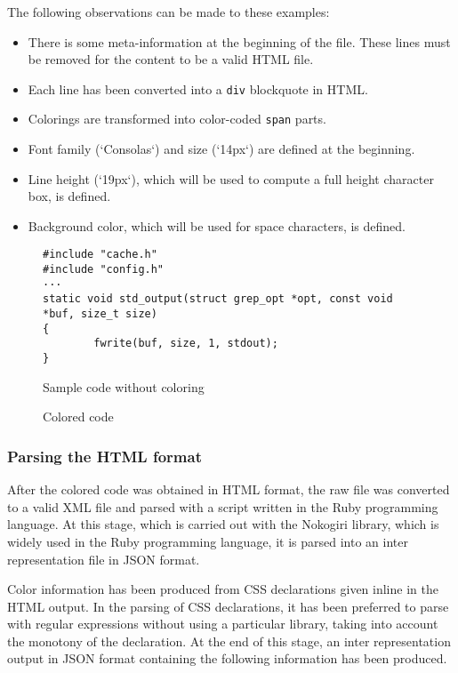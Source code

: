 \documentclass{article}
\begin{document}
The following observations can be made to these examples:

\begin{itemize}
\item There is some meta-information at the beginning of the file. These lines must be removed for the content to be a valid HTML file.
\item Each line has been converted into a \texttt{div} blockquote in HTML.
\item Colorings are transformed into color-coded \texttt{span} parts.
\item Font family (`Consolas`) and size (`14px`) are defined at the beginning.
\item Line height (`19px`), which will be used to compute a full height character box, is defined.
\item Background color, which will be used for space characters, is defined.
\end{itemize}

\begin{figure}[htb]
  \centering
  \begin{BVerbatim}
#include "cache.h"
#include "config.h"
···
static void std_output(struct grep_opt *opt, const void *buf, size_t size)
{
        fwrite(buf, size, 1, stdout);
}
  \end{BVerbatim}
  \caption{Sample code without coloring}
  \label{fig:plain_code}
\end{figure}

\begin{figure}[h]
  \centering
  
  \caption{Colored code}
  \label{fig:colored_code}
\end{figure}

\subsubsection{Parsing the HTML format}

After the colored code was obtained in HTML format, the raw file was converted to a valid XML file and parsed with a script written in the Ruby programming language. At this stage, which is carried out with the Nokogiri library\cite{nokogiri2022package}, which is widely used in the Ruby programming language, it is parsed into an inter representation file in JSON format.

Color information has been produced from CSS declarations given inline in the HTML output. In the parsing of CSS declarations, it has been preferred to parse with regular expressions without using a particular library, taking into account the monotony of the declaration. At the end of this stage, an inter representation output in JSON format containing the following information has been produced.
\end{document}
